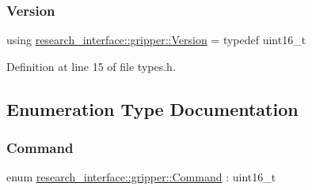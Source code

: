 \subsubsection{\texorpdfstring{Version}{Version}}
{\footnotesize\ttfamily using \hyperlink{namespaceresearch__interface_1_1gripper_a76ede520b2fa3582ac95cd919eceef5b}{research\+\_\+interface\+::gripper\+::\+Version} = typedef uint16\+\_\+t}



Definition at line 15 of file types.\+h.



\subsection{Enumeration Type Documentation}
\mbox{\label{namespaceresearch__interface_1_1gripper_adeda0327764e059bac8a5f967ce41590}} 
\subsubsection{\texorpdfstring{Command}{Command}}
{\footnotesize\ttfamily enum \hyperlink{namespaceresearch__interface_1_1gripper_adeda0327764e059bac8a5f967ce41590}{research\+\_\+interface\+::gripper\+::\+Command} \+: uint16\+\_\+t\hspace{0.3cm}{\ttfamily [strong]}}

